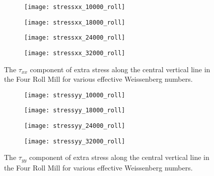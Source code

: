 \begin{figure}[tp]
	\centering
\begin{subfigure}{0.5\linewidth}
	\texttt{[image: stressxx\_10000\_roll]}
	\label{fig:stressxx_very_low}
\end{subfigure}\hfill
\begin{subfigure}{0.5\linewidth}
	\texttt{[image: stressxx\_18000\_roll]}
	\label{fig:stressxx_low}
\end{subfigure}
\medskip
\begin{subfigure}{0.5\linewidth}
	\texttt{[image: stressxx\_24000\_roll]}
	\label{fig:stressxx_med}
\end{subfigure}\hfill
\begin{subfigure}{0.5\linewidth}
	\texttt{[image: stressxx\_32000\_roll]}
	\label{fig:stressxx_high}
\end{subfigure}
\caption{The $\tau_{xx}$ component of extra stress along the central vertical line in the Four Roll Mill for various effective Weissenberg numbers.}
\label{fig:stressxx_roll_group}
\end{figure}

\begin{figure}[htbp]
	\centering
\begin{subfigure}{0.5\linewidth}
	\texttt{[image: stressyy\_10000\_roll]}
	\label{fig:stressyy_very_low}
\end{subfigure}\hfill
\begin{subfigure}{0.5\linewidth}
	\texttt{[image: stressyy\_18000\_roll]}
	\label{fig:stressyy_low}
\end{subfigure}
\medskip
\begin{subfigure}{0.5\linewidth}
	\texttt{[image: stressyy\_24000\_roll]}
	\label{fig:stressyy_med}
\end{subfigure}\hfill
\begin{subfigure}{0.5\linewidth}
	\texttt{[image: stressyy\_32000\_roll]}
	\label{fig:stressyy_high}
\end{subfigure}
\caption{The $\tau_{yy}$ component of extra stress along the central vertical line in the Four Roll Mill for various effective Weissenberg numbers.}
\label{fig:stressyy_roll_group}
\end{figure}

